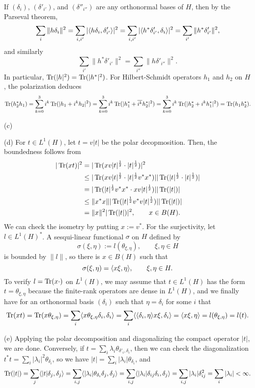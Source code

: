 \documentclass{../../large}
\begin{document}
\begin{pf}

If $(\delta_i)$, $(\delta'_{i'})$, and $(\delta''_{i''})$ are any orthonormal bases of $H$, then by the Parseval theorem,
\[\sum_i\|h\delta_i\|^2
=\sum_{i,i'}|\langle h\delta_i,\delta'_{i'}\rangle|^2
=\sum_{i,i'}|\langle h^*\delta'_{i'},\delta_i\rangle|^2
=\sum_{i'}\|h^*\delta'_{i'}\|^2,\]
and similarly
\[\sum_{i'}\|h^*\delta'_{i'}\|^2=\sum_{i''}\|h\delta'_{i''}\|^2.\]
In particular, $\operatorname{Tr}(|h|^2)=\operatorname{Tr}(|h^*|^2)$.
For Hilbert-Schmidt operators $h_1$ and $h_2$ on $H$, the polarization deduces
\[\operatorname{Tr}(h_2^*h_1)
=\sum_{k=0}^3i^k\operatorname{Tr}(|h_1+i^kh_2|^2)
=\sum_{k=0}^3i^k\operatorname{Tr}(|h_1^*+\overline{i^k}h_2^*|^2)
=\sum_{k=0}^3i^k\operatorname{Tr}(|h_2^*+i^kh_1^*|^2)
=\operatorname{Tr}(h_1h_2^*).\]

(c)


(d)
For $t\in L^1(H)$, let $t=v|t|$ be the polar decopmosition.
Then, the boundedness follows from
\begin{align*}
|\operatorname{Tr}(xt)|^2
&=|\operatorname{Tr}(xv|t|^{\frac12}\cdot|t|^{\frac12})|^2\\
&\le|\operatorname{Tr}(xv|t|^{\frac12}\cdot|t|^{\frac12}v^*x^*)||\operatorname{Tr}(|t|^{\frac12}\cdot|t|^{\frac12})|\\
&=|\operatorname{Tr}(|t|^{\frac12}v^*x^*\cdot xv|t|^{\frac12})||\operatorname{Tr}(|t|)|\\
&\le\|x^*x\||\operatorname{Tr}(|t|^{\frac12}v^*v|t|^{\frac12})||\operatorname{Tr}(|t|)|\\
&=\|x\|^2|\operatorname{Tr}(|t|)|^2,\qquad x\in B(H).
\end{align*}
We can check the isometry by putting $x:=v^*$.
For the surjectivity, let $l\in L^1(H)^*$.
A sesqui-linear functional $\sigma$ on $H$ defined by
\[\sigma(\xi,\eta):=l(\theta_{\xi,\eta}),\qquad\xi,\eta\in H\]
is bounded by $\|l\|$, so there is $x\in B(H)$ such that
\[\sigma(\xi,\eta)=\langle x\xi,\eta\rangle,\qquad\xi,\eta\in H.\]
To verify $l=\operatorname{Tr}(x\cdot)$ on $L^1(H)$, we may assume that $t\in L^1(H)$ has the form $t=\theta_{\xi,\eta}$ because the finite-rank operators are dense in $L^1(H)$, and we finally have for an orthonormal basis $(\delta_i)$ such that $\eta=\delta_i$ for some $i$ that
\[\operatorname{Tr}(xt)=\operatorname{Tr}(x\theta_{\xi,\eta})=\sum_i\langle x\theta_{\xi,\eta}\delta_i,\delta_i\rangle=\sum_i\langle\langle\delta_i,\eta\rangle x\xi,\delta_i\rangle=\langle x\xi,\eta\rangle=l(\theta_{\xi,\eta})=l(t).\]


(e)
Applying the polar decomposition and diagonalizing the compact operator $|t|$, we are done.
Conversely, if $t=\sum_i\lambda_i\theta_{\delta'_i,\delta_i}$, then we can check the diagonalization $t^*t=\sum_i|\lambda_i|^2\theta_{\delta_i}$, so we have $|t|=\sum_i|\lambda_i|\theta_{\delta_i}$, and
\[\operatorname{Tr}(|t|)=\sum_j\langle|t|\delta_j,\delta_j\rangle=\sum_{i,j}\langle|\lambda_i|\theta_{\delta_i}\delta_j,\delta_j\rangle=\sum_{i,j}\langle|\lambda_i|\delta_{ij}\delta_i,\delta_j\rangle=\sum_{i,j}|\lambda_i|\delta_{ij}^2=\sum_i|\lambda_i|<\infty.\]


\end{pf}
\end{document}
